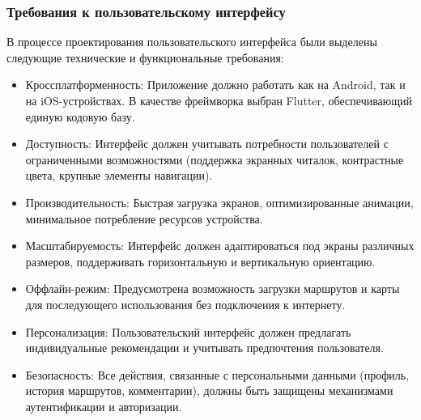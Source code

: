 \subsubsection*{Требования к пользовательскому интерфейсу}
В процессе проектирования пользовательского интерфейса были выделены следующие технические и функциональные требования:
\begin{itemize}
    \item Кроссплатформенность: Приложение должно работать как на Android, так и на iOS-устройствах. В качестве фреймворка выбран Flutter, обеспечивающий единую кодовую базу.
    \item Доступность: Интерфейс должен учитывать потребности пользователей с ограниченными возможностями (поддержка экранных читалок, контрастные цвета, крупные элементы навигации).
    \item Производительность: Быстрая загрузка экранов, оптимизированные анимации, минимальное потребление ресурсов устройства.
    \item Масштабируемость: Интерфейс должен адаптироваться под экраны различных размеров, поддерживать горизонтальную и вертикальную ориентацию.
    \item Оффлайн-режим: Предусмотрена возможность загрузки маршрутов и карты для последующего использования без подключения к интернету.
    \item Персонализация: Пользовательский интерфейс должен предлагать индивидуальные рекомендации и учитывать предпочтения пользователя.
    \item Безопасность: Все действия, связанные с персональными данными (профиль, история маршрутов, комментарии), должны быть защищены механизмами аутентификации и авторизации.
\end{itemize}

